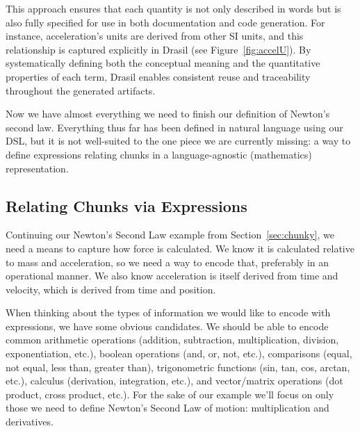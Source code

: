 This approach ensures that each quantity is not only described in words but is 
also fully specified for use in both documentation and code generation. For 
instance, acceleration's units are derived from other SI units, and this 
relationship is captured explicitly in Drasil (see Figure~\ref{fig:accelU}). By 
systematically defining both the conceptual meaning and the quantitative 
properties of each term, Drasil enables consistent reuse and traceability 
throughout the generated artifacts.

Now we have almost everything we need to finish our definition of Newton's 
second law. Everything thus far has been defined in natural language using our 
 DSL, but it is not well-suited to the one piece we are 
currently missing: a way to define expressions relating chunks in a 
language-agnostic (mathematics) representation.

\subsection{Relating Chunks via Expressions}
\label{sec:expr}

Continuing our Newton's Second Law example from Section~\ref{sec:chunky}, we 
need a means to capture how force is calculated. We know it is calculated 
relative to mass and acceleration, so we need a way to encode that, preferably 
in an operational manner. We also know acceleration is itself derived from 
time and velocity, which is derived from time and position.

When thinking about the types of information we would like to encode with 
expressions, we have some obvious candidates. We should be able to encode 
common arithmetic operations (addition, subtraction, multiplication, division, 
exponentiation, etc.), boolean operations (and, or, not, etc.), comparisons 
(equal, not equal, less than, greater than), trigonometric functions (sin, tan, 
cos, arctan, etc.), calculus (derivation, integration, etc.), and vector/matrix 
operations (dot product, cross product, etc.). For the sake of our example 
we'll focus on only those we need to define Newton's Second Law of motion: 
multiplication and derivatives.


